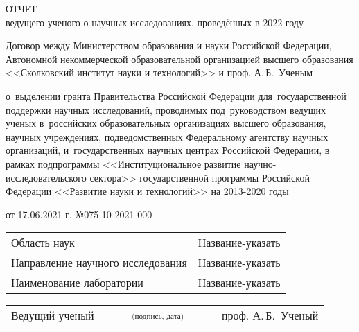\begin{titlepage}


\begin{center}
  \vspace*{2.5cm}

  ОТЧЕТ\\
  ведущего ученого о научных исследованиях, проведённых в 2022 году
  \\

  \vspace{0.5cm}

  Договор между Министерством образования и науки Российской Федерации,
  \\

  Автономной некоммерческой образовательной организацией высшего образования \\ <<Сколковский институт науки и технологий>>
  и проф. А.\,Б.~Ученым
  \\

  \vspace{0.3cm}

  о~выделении гранта Правительства Российской Федерации для~государственной поддержки научных исследований, проводимых под~руководством ведущих ученых в~российских образовательных организациях высшего образования, научных учреждениях, подведомственных Федеральному агентству научных организаций, и~государственных научных центрах Российской Федерации, в рамках подпрограммы <<Институциональное развитие научно-исследовательского сектора>> государственной программы Российской Федерации <<Развитие науки и технологий>> на 2013-2020 годы
  \\

  \vspace{0.3cm}

  от 17.06.2021 г. №075-10-2021-000
\end{center}

\vspace{1.5cm}

\begin{tabular}{p{7cm} p{8cm}}
  Область наук  &
    Название-указать
  \\
  Направление научного исследования &
    Название-указать
  \\
  Наименование лаборатории &
    Название-указать
\end{tabular}

\vspace{3.0cm}

\begin{small}\begin{listliketab}\begin{tabular}{p{6cm} p{6cm} p{6cm}}
  Ведущий ученый &
  $\underset{\text{(подпись, дата)}}{\underline{\hspace{4cm}}}$ &
  проф. А.\,Б.~Ученый \\
\end{tabular}\end{listliketab}\end{small}

\end{titlepage}

\setcounter{page}{2}
